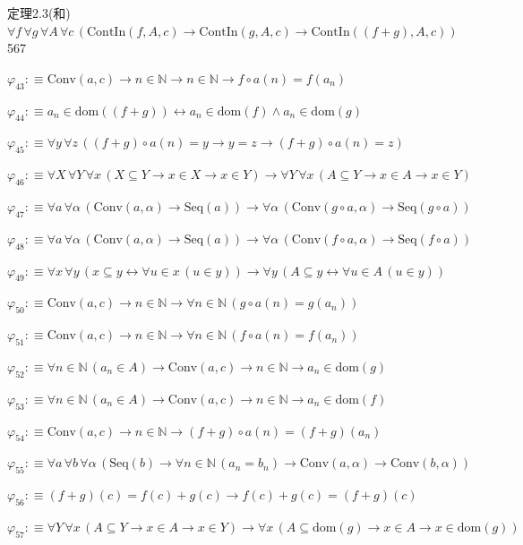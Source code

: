 \begin{fullproof}{定理2.3(和)}{$\forall f\,\forall g\,\forall A\,\forall c\,(\mathrm{ContIn}(f,A,c) \to \mathrm{ContIn}(g,A,c) \to \mathrm{ContIn}((f + g),A,c))$}{567}
\begin{abbrevlist}
\item $\varphi_{43} :\equiv \mathrm{Conv}(a,c) \to n \in \mathbb{N} \to n \in \mathbb{N} \to f \circ a(n) = f(a_{n})$
\item $\varphi_{44} :\equiv a_{n} \in \mathrm{dom}((f + g)) \leftrightarrow a_{n} \in \mathrm{dom}(f) \land a_{n} \in \mathrm{dom}(g)$
\item $\varphi_{45} :\equiv \forall y\,\forall z\,((f + g) \circ a(n) = y \to y = z \to (f + g) \circ a(n) = z)$
\item $\varphi_{46} :\equiv \forall X\,\forall Y\,\forall x\,(X \subseteq Y \to x \in X \to x \in Y) \to \forall Y\,\forall x\,(A \subseteq Y \to x \in A \to x \in Y)$
\item $\varphi_{47} :\equiv \forall a\,\forall \alpha\,(\mathrm{Conv}(a,\alpha) \to \mathrm{Seq}(a)) \to \forall \alpha\,(\mathrm{Conv}(g \circ a,\alpha) \to \mathrm{Seq}(g \circ a))$
\item $\varphi_{48} :\equiv \forall a\,\forall \alpha\,(\mathrm{Conv}(a,\alpha) \to \mathrm{Seq}(a)) \to \forall \alpha\,(\mathrm{Conv}(f \circ a,\alpha) \to \mathrm{Seq}(f \circ a))$
\item $\varphi_{49} :\equiv \forall x\,\forall y\,(x \subseteq y \leftrightarrow \forall u \in x\,(u \in y)) \to \forall y\,(A \subseteq y \leftrightarrow \forall u \in A\,(u \in y))$
\item $\varphi_{50} :\equiv \mathrm{Conv}(a,c) \to n \in \mathbb{N} \to \forall n \in \mathbb{N}\,(g \circ a(n) = g(a_{n}))$
\item $\varphi_{51} :\equiv \mathrm{Conv}(a,c) \to n \in \mathbb{N} \to \forall n \in \mathbb{N}\,(f \circ a(n) = f(a_{n}))$
\item $\varphi_{52} :\equiv \forall n \in \mathbb{N}\,(a_{n} \in A) \to \mathrm{Conv}(a,c) \to n \in \mathbb{N} \to a_{n} \in \mathrm{dom}(g)$
\item $\varphi_{53} :\equiv \forall n \in \mathbb{N}\,(a_{n} \in A) \to \mathrm{Conv}(a,c) \to n \in \mathbb{N} \to a_{n} \in \mathrm{dom}(f)$
\item $\varphi_{54} :\equiv \mathrm{Conv}(a,c) \to n \in \mathbb{N} \to (f + g) \circ a(n) = (f + g)(a_{n})$
\item $\varphi_{55} :\equiv \forall a\,\forall b\,\forall \alpha\,(\mathrm{Seq}(b) \to \forall n \in \mathbb{N}\,(a_{n} = b_{n}) \to \mathrm{Conv}(a,\alpha) \to \mathrm{Conv}(b,\alpha))$
\item $\varphi_{56} :\equiv (f + g)(c) = f(c) + g(c) \to f(c) + g(c) = (f + g)(c)$
\item $\varphi_{57} :\equiv \forall Y\,\forall x\,(A \subseteq Y \to x \in A \to x \in Y) \to \forall x\,(A \subseteq \mathrm{dom}(g) \to x \in A \to x \in \mathrm{dom}(g))$

\end{abbrevlist}
\end{fullproof}
